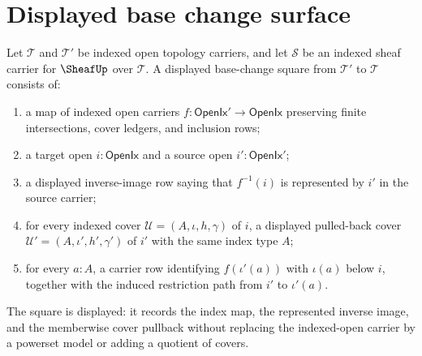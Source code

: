 \section{Displayed base change surface}
\label{sec:sheaf-base-change-surface}

\begin{definition}
\label{def:sheaf-displayed-base-change-square}
Let $\mathcal{T}$ and $\mathcal{T}'$ be indexed open topology carriers, and let $\mathcal{S}$ be an indexed sheaf carrier for $\SheafUp$ over $\mathcal{T}$. A displayed base-change square from $\mathcal{T}'$ to $\mathcal{T}$ consists of:
\begin{enumerate}
\item a map of indexed open carriers $f:\mathsf{OpenIx}'\to\mathsf{OpenIx}$ preserving finite intersections, cover ledgers, and inclusion rows;
\item a target open $i:\mathsf{OpenIx}$ and a source open $i':\mathsf{OpenIx}'$;
\item a displayed inverse-image row saying that $f^{-1}(i)$ is represented by $i'$ in the source carrier;
\item for every indexed cover $\mathcal{U}=(A,\iota,h,\gamma)$ of $i$, a displayed pulled-back cover $\mathcal{U}'=(A,\iota',h',\gamma')$ of $i'$ with the same index type $A$;
\item for every $a:A$, a carrier row identifying $f(\iota'(a))$ with $\iota(a)$ below $i$, together with the induced restriction path from $i'$ to $\iota'(a)$.
\end{enumerate}
The square is displayed: it records the index map, the represented inverse image, and the memberwise cover pullback without replacing the indexed-open carrier by a powerset model or adding a quotient of covers.
\end{definition}


